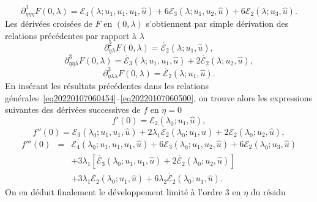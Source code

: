\documentclass{article}
\begin{document}
\begin{equation}
  \partial_{\eta  \eta  \eta}^3 F (0, \lambda) =\mathcal{E}_4
  (\lambda ; u_1, u_1, u_1, \hat{u}) + 6\mathcal{E}_3 (\lambda ; u_1, u_2,
  \hat{u}) + 6\mathcal{E}_2 (\lambda ; u_3, \hat{u}) .
\end{equation}
Les d{\'e}riv{\'e}es crois{\'e}es de $F$ en $(0, \lambda)$ s'obtiennent par
simple d{\'e}rivation des relations pr{\'e}c{\'e}dentes par rapport {\`a}
$\lambda$
\begin{equation}
  \partial_{\eta  \lambda}^2 F (0, \lambda) = \dot{\mathcal{E}_2}
  (\lambda ; u_1, \hat{u}),
\end{equation}
\begin{equation}
  \partial_{\eta  \eta  \lambda}^3 F (0, \lambda) =
  \dot{\mathcal{E}_3} (\lambda ; u_1, u_1, \hat{u}) + 2 \dot{\mathcal{E}_2}
  (\lambda ; u_2, \hat{u}),
\end{equation}
\begin{equation}
  \partial_{\eta  \lambda  \lambda}^3 F (0, \lambda) =
  \ddot{\mathcal{E}_2} (\lambda ; u_1, \hat{u}) .
\end{equation}
En ins{\'e}rant les r{\'e}sultats pr{\'e}c{\'e}dentes dans les relations
g{\'e}n{\'e}rales~\eqref{eq20220107060454}--\eqref{eq20220107060500}, on
trouve alors les expressions suivantes des d{\'e}riv{\'e}es successives de $f$
en $\eta = 0$
\begin{equation}
  f' (0) =\mathcal{E}_2 (\lambda_0 ; u_1, \hat{u}),
\end{equation}
\begin{equation}
  f'' (0) =\mathcal{E}_3 (\lambda_0 ; u_1, u_1, \hat{u}) + 2 \lambda_1
  \dot{\mathcal{E}_2} (\lambda_0 ; u_1, \hat{u}) + 2\mathcal{E}_2 (\lambda_0 ;
  u_2, \hat{u}),
\end{equation}
\begin{eqnarray}
  f''' (0) & = & \mathcal{E}_4 (\lambda_0 ; u_1, u_1, u_1, \hat{u}) +
  6\mathcal{E}_3 (\lambda_0 ; u_1, u_2, \hat{u}) + 6\mathcal{E}_2 (\lambda_0 ;
  u_3, \hat{u}) \nonumber\\
  &  &  + 3 \lambda_1  [\dot{\mathcal{E}_3} (\lambda_0 ; u_1, u_1,
  \hat{u}) + 2 \dot{\mathcal{E}_2} (\lambda_0 ; u_2, \hat{u})] \nonumber\\
  &  &  + 3 \lambda_1   \ddot{\mathcal{E}_2} (\lambda_0 ; u_1,
  \hat{u}) + 6 \lambda_2  \dot{\mathcal{E}_2} (\lambda_0 ; u_1, \hat{u}) .
\end{eqnarray}
On en d{\'e}duit finalement le d{\'e}veloppement limit{\'e} {\`a} l'ordre 3 en
$\eta$ du r{\'e}sidu
\end{document}
